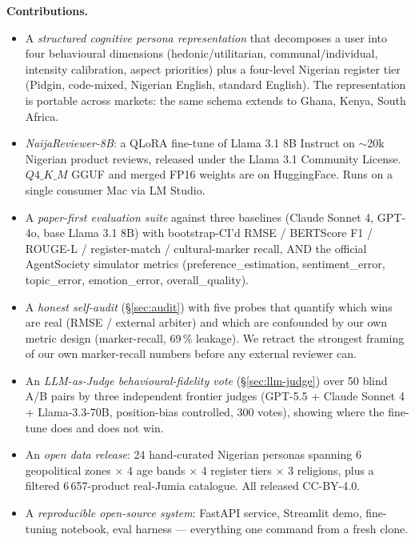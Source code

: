 \documentclass[sigconf,nonacm,balance]{acmart}
\begin{document}
\textbf{Contributions.}
\begin{itemize}[leftmargin=*]
    \item A \emph{structured cognitive persona representation} that decomposes
          a user into four behavioural dimensions (hedonic/utilitarian,
          communal/individual, intensity calibration, aspect priorities) plus
          a four-level Nigerian register tier (Pidgin, code-mixed, Nigerian
          English, standard English). The representation is portable across
          markets: the same schema extends to Ghana, Kenya, South Africa.
    \item \emph{NaijaReviewer-8B}: a QLoRA fine-tune of Llama 3.1 8B Instruct
          on $\sim$20k Nigerian product reviews, released under the Llama 3.1
          Community License. $Q4\_K\_M$ GGUF and merged FP16 weights are on
          HuggingFace. Runs on a single consumer Mac via LM Studio.
    \item A \emph{paper-first evaluation suite} against three baselines
          (Claude Sonnet 4, GPT-4o, base Llama 3.1 8B) with bootstrap-CI'd
          RMSE / BERTScore F1 / ROUGE-L / register-match / cultural-marker
          recall, AND the official AgentSociety simulator metrics
          (\textsf{preference\_estimation}, \textsf{sentiment\_error},
          \textsf{topic\_error}, \textsf{emotion\_error},
          \textsf{overall\_quality}).
    \item A \emph{honest self-audit} (§\ref{sec:audit}) with five probes
          that quantify which wins are real (RMSE / external arbiter) and
          which are confounded by our own metric design (marker-recall,
          69\,\% leakage). We retract the strongest framing of our own
          marker-recall numbers before any external reviewer can.
    \item An \emph{LLM-as-Judge behavioural-fidelity vote}
          (§\ref{sec:llm-judge}) over 50 blind A/B pairs by three independent
          frontier judges (GPT-5.5 + Claude Sonnet 4 + Llama-3.3-70B,
          position-bias controlled, 300 votes), showing where the fine-tune
          does and does not win.
    \item An \emph{open data release}: 24 hand-curated Nigerian personas
          spanning 6 geopolitical zones $\times$ 4 age bands $\times$ 4 register
          tiers $\times$ 3 religions, plus a filtered 6\,657-product
          real-Jumia catalogue. All released CC-BY-4.0.
    \item A \emph{reproducible open-source system}: FastAPI service,
          Streamlit demo, fine-tuning notebook, eval harness ---
          everything one command from a fresh clone.
\end{itemize}
\end{document}
